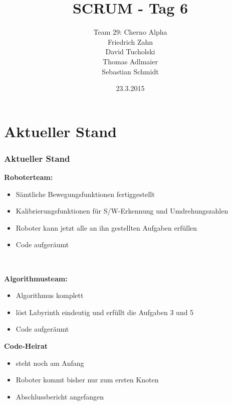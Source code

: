\documentclass[ddcfooter,nototalpage]{tudbeamer}
\begin{document}
\title{SCRUM - Tag 6}
\author{Team 29: Cherno Alpha \\
Friedrich Zahn \\
David Tucholski \\
Thomas Adlmaier \\
Sebastian Schmidt
}
\date{23.3.2015}
\maketitle

\section{Aktueller Stand}
\begin{frame}
\frametitle{Aktueller Stand}

\textbf{Roboterteam:}
\begin{itemize}
\item Sämtliche Bewegungsfunktionen fertiggestellt
\item Kalibrierungsfunktionen für S/W-Erkennung und Umdrehungszahlen
\item Roboter kann jetzt alle an ihn gestellten Aufgaben erfüllen
\item Code aufgeräumt
\end{itemize}\ \linebreak

\textbf{Algorithmusteam:}
\begin{itemize}
\item Algorithmus komplett
\item löst Labyrinth eindeutig und erfüllt die Aufgaben 3 und 5
\item Code aufgeräumt
\end{itemize}
\end{frame}

\begin{frame}
\normalsize
\textbf{Code-Heirat}
\begin{itemize}
\item steht noch am Anfang
\item Roboter kommt bisher nur zum ersten Knoten
\end{itemize}

\vspace{.5cm}

\begin{itemize}
\item Abschlussbericht angefangen
\end{itemize}
\end{frame}
\end{document}
